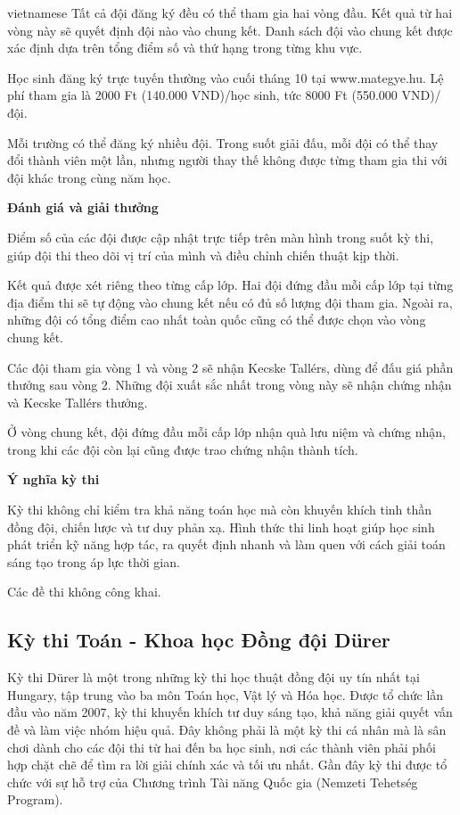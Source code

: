 \documentclass{article}
\begin{document}
\begin{otherlanguage*}{vietnamese}
Tất cả đội đăng ký đều có thể tham gia hai vòng đầu. Kết quả từ hai vòng này sẽ quyết định đội nào vào chung kết.
Danh sách đội vào chung kết được xác định dựa trên tổng điểm số và thứ hạng trong từng khu vực.

Học sinh đăng ký trực tuyến thường vào cuối tháng 10 tại www.mategye.hu. Lệ phí tham gia là 2000 Ft (140.000 VND)/học sinh, tức 8000 Ft (550.000 VND)/đội.

Mỗi trường có thể đăng ký nhiều đội. Trong suốt giải đấu, mỗi đội có thể thay đổi thành viên một lần,
nhưng người thay thế không được từng tham gia thi với đội khác trong cùng năm học.

\textbf{Đánh giá và giải thưởng}

Điểm số của các đội được cập nhật trực tiếp trên màn hình trong suốt kỳ thi, giúp đội thi theo dõi vị trí của mình và điều chỉnh chiến thuật kịp thời.

Kết quả được xét riêng theo từng cấp lớp. Hai đội đứng đầu mỗi cấp lớp tại từng địa điểm thi sẽ tự động vào chung kết nếu có đủ số lượng đội tham gia.
Ngoài ra, những đội có tổng điểm cao nhất toàn quốc cũng có thể được chọn vào vòng chung kết.

Các đội tham gia vòng 1 và vòng 2 sẽ nhận Kecske Tallérs, dùng để đấu giá phần thưởng sau vòng 2.
Những đội xuất sắc nhất trong vòng này sẽ nhận chứng nhận và Kecske Tallérs thưởng.

Ở vòng chung kết, đội đứng đầu mỗi cấp lớp nhận quà lưu niệm và chứng nhận, trong khi các đội còn lại cũng được trao chứng nhận thành tích.

\textbf{Ý nghĩa kỳ thi}

Kỳ thi không chỉ kiểm tra khả năng toán học mà còn khuyến khích tinh thần đồng đội, chiến lược và tư duy phản xạ.
Hình thức thi linh hoạt giúp học sinh phát triển kỹ năng hợp tác, ra quyết định nhanh và làm quen với cách giải toán sáng tạo trong áp lực thời gian.

\begin{remark*}
    Các đề thi không công khai.
\end{remark*}

\newpage

\subsection{Kỳ thi Toán - Khoa học Đồng đội Dürer}

Kỳ thi Dürer là một trong những kỳ thi học thuật đồng đội uy tín nhất tại Hungary, tập trung vào ba môn Toán học, Vật lý và Hóa học.
Được tổ chức lần đầu vào năm 2007, kỳ thi khuyến khích tư duy sáng tạo, khả năng giải quyết vấn đề và làm việc nhóm hiệu quả.
Đây không phải là một kỳ thi cá nhân mà là sân chơi dành cho các đội thi từ hai đến ba học sinh,
nơi các thành viên phải phối hợp chặt chẽ để tìm ra lời giải chính xác và tối ưu nhất.
Gần đây kỳ thi được tổ chức với sự hỗ trợ của Chương trình Tài năng Quốc gia (Nemzeti Tehetség Program).


\end{otherlanguage*}
\end{document}

